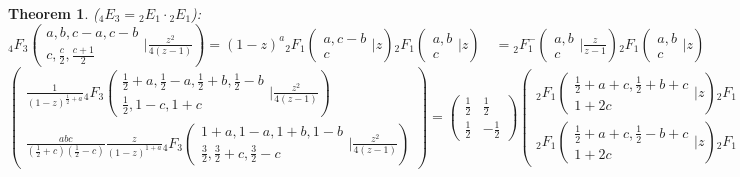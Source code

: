\documentclass[12pt]{article}
\numberwithin{equation}{section}
\newtheorem{theorem}{Theorem}[section]
\newcommand{\Head}[3] {{}_{#1}{#2}_{#3}}
\newcommand{\ArgS}[3] {( \begin{smallmatrix} #1 \\ #2 \end{smallmatrix} | {#3})}
\newcommand{\FFs}[6] {{}_{#1}{#2}_{#3} ( \begin{smallmatrix} #4 \\ #5 \end{smallmatrix} | {#6}  )}
\newcommand{\FFes}[7] {{}_{#1}^{\,}{#2}_{#3}^{#4} ( \begin{smallmatrix} #5 \\ #6 \end{smallmatrix} | {#7} )}
\begin{document}
\begin{theorem}
\label{thm_4e3_2e1_2e1}
($\Head{4}{E}{3} = \Head{2}{E}{1} \cdot \Head{2}{E}{1}$):
\begin{equation*}
\FFs{4}{F}{3}{a,b,c-a,c-b}{c, \frac{c}{2}, \frac{c+1}{2}}{\tfrac{z^2}{4(z-1)}} = (1-z)^a \FFs{2}{F}{1}{a,c-b}{c}{z} \FFs{2}{F}{1}{a,b}{c}{z} \quad =  \FFes{2}{F}{1}{-}{a,b}{c}{\tfrac{z}{z-1}} \FFs{2}{F}{1}{a,b}{c}{z}
\end{equation*}
\begin{equation*}
\left(\begin{array}{r}
\frac{1}{(1-z)^{\frac12+a}} \Head{4}{F}{3} \ArgS{\frac12+a,\frac12-a,\frac12+b,\frac12-b}{\frac{1}{2}, 1-c, 1+c}{\tfrac{z^2}{4(z-1)}}\\
\frac{a b c}{(\frac12+c)(\frac12-c)} \frac{z}{(1-z)^{1+a}} \Head{4}{F}{3} \ArgS{1+a,1-a,1+b,1-b}{\frac32, \frac32+c, \frac32-c}{\tfrac{z^2}{4(z-1)}}
\end{array}\right)
 =
\begin{pmatrix}
\tfrac12 & \tfrac12 \\
\tfrac12 & -\tfrac12
\end{pmatrix}
\begin{pmatrix}
\Head{2}{F}{1}\ArgS{\frac12+a+c,\frac12+b+c}{1+2c}{z} \Head{2}{F}{1}\ArgS{\frac12+a-c,\frac12-b-c}{1-2c}{z}
\\
\Head{2}{F}{1} \ArgS{\frac12+a+c,\frac12-b+c}{1+2c}{z}\Head{2}{F}{1} \ArgS{\frac12+a-c,\frac12+b-c}{1-2c}{z} \end{pmatrix}
\end{equation*}
\end{theorem}
\end{document}
